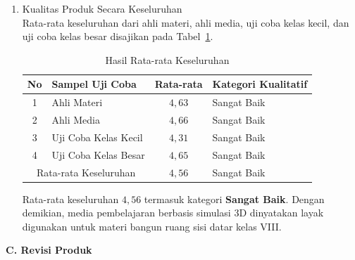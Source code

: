 \begin{enumerate}
    \item Kualitas Produk Secara Keseluruhan\\
    \hspace*{1cm}Rata-rata keseluruhan dari ahli materi, ahli media, uji coba kelas kecil, dan uji coba kelas besar disajikan pada Tabel~\ref{ratakeseluruhan}.
    \begin{table}[H]
        \centering
        \caption{Hasil Rata-rata Keseluruhan}
        \label{ratakeseluruhan}
        \begin{tabular}{|c|l|c|l|}
            \hline
            \textbf{No} & \textbf{Sampel Uji Coba} & \textbf{Rata-rata} & \textbf{Kategori Kualitatif}\\
            \hline
            1 & Ahli Materi & \(4{,}63\) & Sangat Baik\\
            2 & Ahli Media & \( 4{,}66 \) & Sangat Baik\\
            3 & Uji Coba Kelas Kecil & \(4{,}31\) & Sangat Baik\\
            4 & Uji Coba Kelas Besar & \( 4{,}65 \) & Sangat Baik\\
            \hline
            \multicolumn{2}{|c|}{Rata-rata Keseluruhan} & \(4{,}56\) & Sangat Baik\\
            \hline
        \end{tabular}
    \end{table}
    \hspace*{1cm}Rata-rata keseluruhan \(4{,}56\) termasuk kategori \textbf{Sangat Baik}. Dengan demikian, media pembelajaran berbasis simulasi 3D dinyatakan layak digunakan untuk materi bangun ruang sisi datar kelas VIII.

\end{enumerate}

\newpage
\textbf{C. Revisi Produk}

